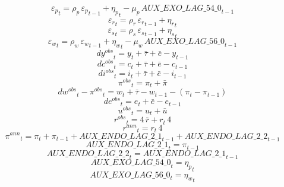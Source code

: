 \begin{dmath}
{{\varepsilon_p}}_{t}={{\rho_p}}\, {{\varepsilon_p}}_{t-1}+{{\eta_p}}_{t}-{{\mu_p}}\, {AUX\_EXO\_LAG\_54\_0}_{t-1}
\end{dmath}
\begin{dmath}
{{\varepsilon_r}}_{t}={{\rho_r}}\, {{\varepsilon_r}}_{t-1}+{{\eta_r}}_{t}
\end{dmath}
\begin{dmath}
{{\varepsilon_s}}_{t}={{\rho_s}}\, {{\varepsilon_s}}_{t-1}+{{\eta_s}}_{t}
\end{dmath}
\begin{dmath}
{{\varepsilon_w}}_{t}={{\rho_w}}\, {{\varepsilon_w}}_{t-1}+{{\eta_w}}_{t}-{{\mu_w}}\, {AUX\_EXO\_LAG\_56\_0}_{t-1}
\end{dmath}
\begin{dmath}
{{dy^{obs}}}_{t}={{y}}_{t}+{{\bar{\tau}}}+{{\bar{e}}}-{{y}}_{t-1}
\end{dmath}
\begin{dmath}
{{dc^{obs}}}_{t}={{c}}_{t}+{{\bar{\tau}}}+{{\bar{e}}}-{{c}}_{t-1}
\end{dmath}
\begin{dmath}
{{di^{obs}}}_{t}={{i}}_{t}+{{\bar{\tau}}}+{{\bar{e}}}-{{i}}_{t-1}
\end{dmath}
\begin{dmath}
{{\pi^{obs}}}_{t}={{\pi}}_{t}+{{\bar{\pi}}}
\end{dmath}
\begin{dmath}
{{dw^{obs}}}_{t}-{{\pi^{obs}}}_{t}={{w}}_{t}+{{\bar{\tau}}}-{{w}}_{t-1}-\left({{\pi}}_{t}-{{\pi}}_{t-1}\right)
\end{dmath}
\begin{dmath}
{{de^{obs}}}_{t}={{e}}_{t}+{{\bar{e}}}-{{e}}_{t-1}
\end{dmath}
\begin{dmath}
{{u^{obs}}}_{t}={{u}}_{t}+{{\bar{u}}}
\end{dmath}
\begin{dmath}
{{r^{obs}}}_{t}=4\, {{\bar{r}}}+{{r}}_{t}\, 4
\end{dmath}
\begin{dmath}
{{r^{ann}}}_{t}={{r}}_{t}\, 4
\end{dmath}
\begin{dmath}
{{\pi^{ann}}}_{t}={{\pi}}_{t}+{{\pi}}_{t-1}+{AUX\_ENDO\_LAG\_2\_1}_{t-1}+{AUX\_ENDO\_LAG\_2\_2}_{t-1}
\end{dmath}
\begin{dmath}
{AUX\_ENDO\_LAG\_2\_1}_{t}={{\pi}}_{t-1}
\end{dmath}
\begin{dmath}
{AUX\_ENDO\_LAG\_2\_2}_{t}={AUX\_ENDO\_LAG\_2\_1}_{t-1}
\end{dmath}
\begin{dmath}
{AUX\_EXO\_LAG\_54\_0}_{t}={{\eta_p}}_{t}
\end{dmath}
\begin{dmath}
{AUX\_EXO\_LAG\_56\_0}_{t}={{\eta_w}}_{t}
\end{dmath}
